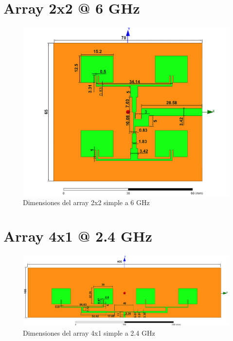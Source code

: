\section{Array 2x2 @ 6 GHz}
\vfill
\begin{figure}[H]
   	 \centering
        \includegraphics[width=\textwidth ,height=\textheight, keepaspectratio=true]{archivos/desarrollo/autocad/8}
        \caption{Dimensiones del array 2x2 simple a 6 GHz}
        \label{fig:2x22}
\end{figure}
\vfill
\newpage

\section{Array 4x1 @ 2.4 GHz}
\vfill
\begin{figure}[H]
   	 \centering
        \includegraphics[width=20cm ,height=\textheight, keepaspectratio=true, angle=90,origin=c]{archivos/desarrollo/autocad/5}
        \caption{Dimensiones del array 4x1 simple a 2.4 GHz}
        \label{fig:4x11}
\end{figure}
\vfill
\newpage


